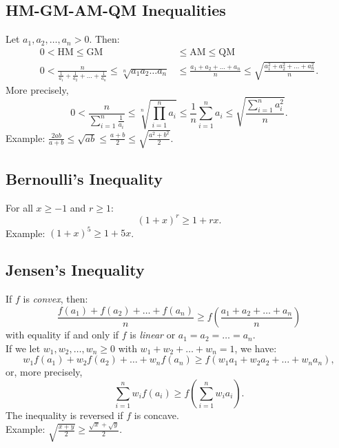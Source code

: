 \documentclass[a4paper,11pt]{article}
\begin{document}
\subsection{HM-GM-AM-QM Inequalities}
\begin{tcolorbox}[breakable]
    Let $a_1, a_2, \dots, a_n > 0$. Then:
    \begin{align*}
        0 < \text{HM} \leq \text{GM} &\leq \text{AM} \leq \text{QM} \\
        0 < \frac{n}{\frac{1}{a_1} + \frac{1}{a_2} + \dots + \frac{1}{a_n}} \leq \sqrt[n]{a_1 a_2 \dots a_n} &\leq \frac{a_1 + a_2 + \dots + a_n}{n} \leq \sqrt{\frac{a_1^2 + a_2^2 + \dots + a_n^2}{n}}.
    \end{align*}
    More precisely,
    \[
    0 < \frac{n}{\sum_{i=1}^n \frac{1}{a_i}} \leq \sqrt[n]{\prod_{i=1}^n a_i} \leq \frac{1}{n} \sum_{i=1}^n a_i \leq \sqrt{\frac{\sum_{i=1}^n a_i^2}{n}}.
    \]
    Example: $\textstyle \frac{2ab}{a+b} \leq \sqrt{ab} \leq \frac{a+b}{2} \leq \sqrt{\frac{a^2+b^2}{2}}$.
\end{tcolorbox}


\subsection{Bernoulli’s Inequality}
\begin{tcolorbox}[breakable]
    For all $x \geq -1$ and $r \geq 1$:
    \[
    (1 + x)^r \geq 1 + rx.
    \]
    Example: $\textstyle (1+x)^5 \geq 1+5x$.
\end{tcolorbox}


\subsection{Jensen's Inequality}
\begin{tcolorbox}[breakable]
    If $f$ is \emph{convex}, then:
    \[
    \frac{f(a_1) + f(a_2) + \dots + f(a_n)}{n} \geq f \left(\frac{a_1 + a_2 + \dots + a_n}{n} \right)
    \]
    with equality if and only if $f$ is \emph{linear} or $a_1 = a_2 = \dots = a_n$. \\[6pt]
    If we let $w_1, w_2, \dots, w_n \geq 0$ with $w_1 + w_2 + \dots + w_n = 1$, we have:
    \[
    w_1 f(a_1) + w_2 f(a_2) + \dots + w_n f(a_n) \geq f(w_1a_1 + w_2a_2 + \dots + w_na_n),
    \]
    or, more precisely,
    \[
    \sum_{i=1}^n w_i f(a_i) \geq f \left( \sum_{i=1}^n w_ia_i \right).
    \]
    The inequality is reversed if $f$ is concave. \\[6pt]
    Example: $\textstyle \sqrt{\frac{x+y}{2}} \geq \frac{\sqrt{x} + \sqrt{y}}{2}$.
\end{tcolorbox}
\end{document}
